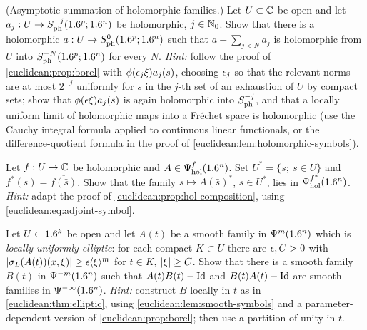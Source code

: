 \begin{exercise}\label{euclidean:ex:hol-asymptotic}
  (Asymptotic summation of holomorphic families.) Let $U\subset\mathbb{C}$ be open
  and let $a_j:U\to S^{-j}_{\mathrm{ph}}(1.6^p;1.6^n)$ be holomorphic, $j\in\mathbb{N}_0$. Show
  that there is a holomorphic $a:U\to S^{0}_{\mathrm{ph}}(1.6^p;1.6^n)$ such that
  $a-\sum_{j<N}a_j$ is holomorphic from $U$ into $S^{-N}_{\mathrm{ph}}(1.6^p;1.6^n)$ for
  every $N$. \emph{Hint:} follow the proof of \cref{euclidean:prop:borel}
  with $\phi(\epsilon_j\xi)a_j(s)$, choosing $\epsilon_j$ so that the relevant norms
  are at most $2^{-j}$ uniformly for $s$ in the $j$-th set of an exhaustion
  of $U$ by compact sets; show that $\phi(\epsilon\xi)a_j(s)$ is again
  holomorphic into $S^{-j}_{\mathrm{ph}}$, and that a locally uniform limit of
  holomorphic maps into a Fr\'echet space is holomorphic (use the Cauchy
  integral formula applied to continuous linear functionals, or the
  difference-quotient formula in the proof of
  \cref{euclidean:lem:holomorphic-symbols}).
\end{exercise}

\begin{exercise}\label{euclidean:ex:hol-adjoint}
  Let $f:U\to\mathbb{C}$ be holomorphic and $A\in\Psi^{f}_{\mathrm{hol}}(1.6^n)$. Set
  $U^*=\{\bar s;\ s\in U\}$ and $f^*(s)=\overline{f(\bar s)}$. Show that the
  family $s\mapsto A(\bar s)^*$, $s\in U^*$, lies in
  $\Psi^{f^*}_{\mathrm{hol}}(1.6^n)$. \emph{Hint:} adapt the proof of
  \cref{euclidean:prop:hol-composition}, using
  \eqref{euclidean:eq:adjoint-symbol}.
\end{exercise}

\begin{exercise}\label{euclidean:ex:smooth-parametrix}
  Let $U\subset1.6^k$ be open and let $A(t)$ be a smooth family in
  $\Psi^{m}(1.6^n)$ which is \emph{locally uniformly elliptic}: for each
  compact $K\subset U$ there are $\epsilon,C>0$ with
  $\lvert \sigma_L(A(t))(x,\xi)\rvert\ge\epsilon\langle \xi\rangle^m$ for $t\in K$, $\lvert \xi\rvert\ge C$.
  Show that there is a smooth family $B(t)$ in $\Psi^{-m}(1.6^n)$ such that
  $A(t)B(t)-\operatorname{Id}$ and $B(t)A(t)-\operatorname{Id}$ are smooth families in
  $\Psi^{-\infty}(1.6^n)$. \emph{Hint:} construct $B$ locally in $t$ as in
  \cref{euclidean:thm:elliptic}, using \cref{euclidean:lem:smooth-symbols}
  and a parameter-dependent version of \cref{euclidean:prop:borel}; then use
  a partition of unity in $t$.
\end{exercise}

